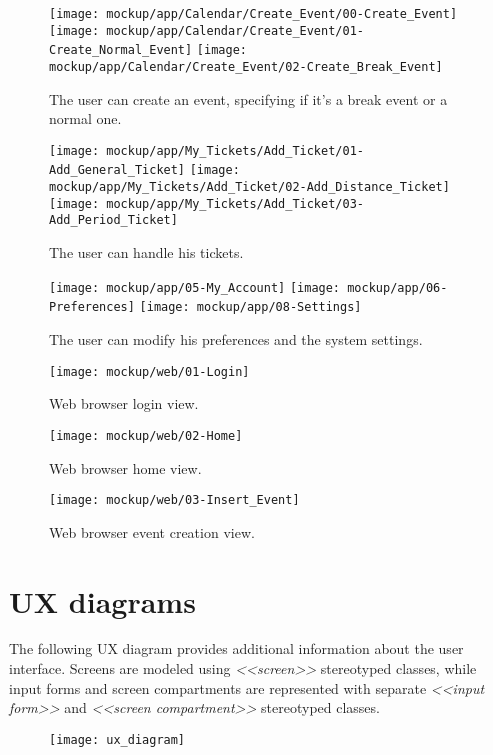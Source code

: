 	\begin{figure}[H]
		\texttt{[image: mockup/app/Calendar/Create\_Event/00-Create\_Event]}
		\hspace{.3cm}
		\texttt{[image: mockup/app/Calendar/Create\_Event/01-Create\_Normal\_Event]}
		\hspace{.3cm}
		\texttt{[image: mockup/app/Calendar/Create\_Event/02-Create\_Break\_Event]}
		\centering 
		\caption{The user can create an event, specifying if it's a break event or a normal one.}
	\end{figure}
	
	\begin{figure}[H]
		\texttt{[image: mockup/app/My\_Tickets/Add\_Ticket/01-Add\_General\_Ticket]}
		\hspace{.3cm}
		\texttt{[image: mockup/app/My\_Tickets/Add\_Ticket/02-Add\_Distance\_Ticket]}
		\hspace{.3cm}
		\texttt{[image: mockup/app/My\_Tickets/Add\_Ticket/03-Add\_Period\_Ticket]}
		\centering 
		\caption{The user can handle his tickets.}
	\end{figure}
	
	\begin{figure}[H]
		\texttt{[image: mockup/app/05-My\_Account]}
		\hspace{.3cm}
		\texttt{[image: mockup/app/06-Preferences]}
		\hspace{.3cm}
		\texttt{[image: mockup/app/08-Settings]}
		\centering 
		\caption{The user can modify his preferences and the system settings.}
	\end{figure}
	
	\begin{figure}[H]
		\texttt{[image: mockup/web/01-Login]}
		\centering
		\caption{Web browser login view.}
	\end{figure}
	\begin{figure}[H]
		\texttt{[image: mockup/web/02-Home]}
		\centering
		\caption{Web browser home view.}
	\end{figure}
	\begin{figure}[H]
		\texttt{[image: mockup/web/03-Insert\_Event]}
		\centering
		\caption{Web browser event creation view.}
	\end{figure}

\section{UX diagrams}
\label{subsect:UX diagrams}
	The following UX diagram provides additional information about the user interface.
Screens are modeled using \textit{\textless\textless screen\textgreater\textgreater} stereotyped classes, while input forms and screen compartments are represented with separate \textit{\textless\textless input form\textgreater\textgreater} and \textit{\textless\textless screen compartment\textgreater\textgreater}
stereotyped classes.
	\begin{figure}[H]
		\texttt{[image: ux\_diagram]}
		\centering
	\end{figure}
	
